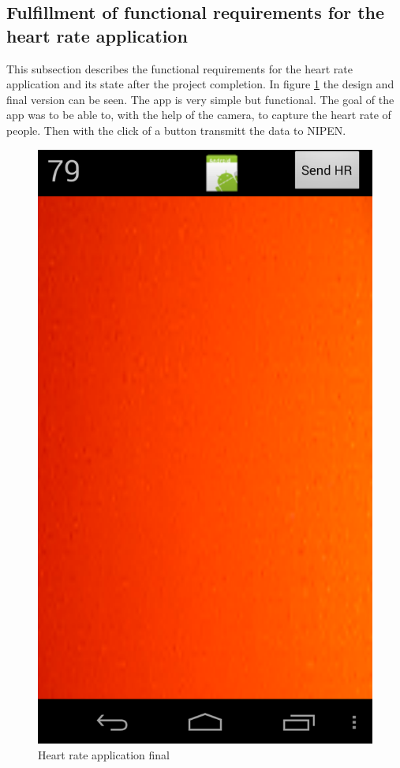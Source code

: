 \subsection{Fulfillment of functional requirements for the heart rate application}

This subsection describes the functional requirements for the heart rate application and its state after the project completion.
In figure \ref{figure:appfinal} the design and final version can be seen.
The app is very simple but functional. 
The goal of the app was to be able to, with the help of the camera, to capture the heart rate of people.
Then with the click of a button transmitt the data to NIPEN.


\begin{figure}[H]
\centering
\includegraphics[scale=0.20]{../Figures/appfinal.png}
\caption{Heart rate application final}
\label{figure:appfinal}
\end{figure}

